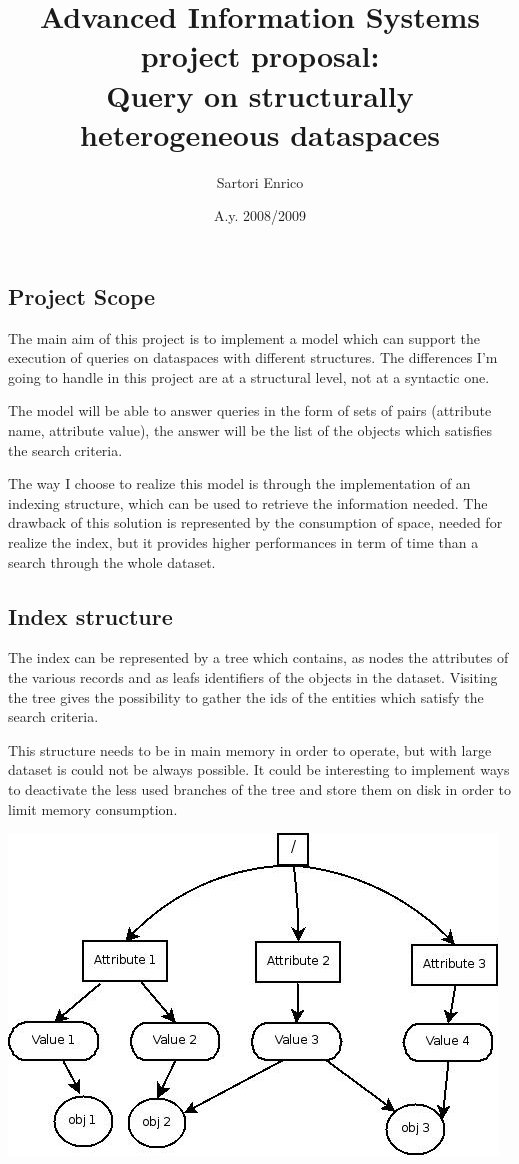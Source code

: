 \documentclass[12pt,a4paper]{article}
\title{Advanced Information Systems project proposal:\\
Query on structurally heterogeneous dataspaces}
\author{Sartori Enrico}
\date{A.y. 2008/2009}
\begin{document}
\maketitle
\subsection*{Project Scope}
The main aim of this project is to implement a model which can support the
execution of queries on dataspaces with different structures.
The differences I'm going to handle in this project are at a structural
level, not at a syntactic one.

The model will be able to answer queries in the form of sets of
pairs (attribute name, attribute value), the answer will be the list of
the objects which satisfies the search criteria.

The way I choose to realize this model is through the implementation of an
indexing structure, which can be used to retrieve the information needed.
The drawback of this solution is represented by the consumption of space,
needed for realize the index, but it provides higher performances in term
of time than a search through the whole dataset.


\subsection*{Index structure}
The index can be represented by a tree which contains, as nodes the
attributes of the various records and as leafs identifiers of the objects
in the dataset. Visiting the tree gives the possibility to gather the ids
of the entities which satisfy the search criteria.

This structure needs to be in main memory in order to operate, but with
large dataset is could not be always possible. It could be interesting to
implement ways to deactivate the less used branches of the tree and store
them on disk in order to limit memory consumption.

\begin{center}
\includegraphics[scale=0.50]{tree.jpg}
\end{center}
\end{document}
